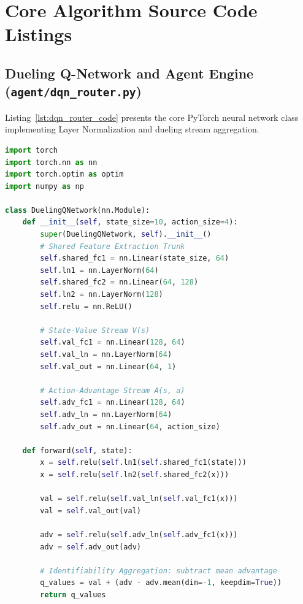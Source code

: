 \chapter{Core Algorithm Source Code Listings}
\label{app:listings}

\section{Dueling Q-Network and Agent Engine (\texttt{agent/dqn\_router.py})}
Listing~\ref{lst:dqn_router_code} presents the core PyTorch neural network class implementing Layer Normalization and dueling stream aggregation.

\begin{lstlisting}[language=Python, caption={PyTorch Dueling Q-Network Architecture with Layer Normalization}, label={lst:dqn_router_code}]
import torch
import torch.nn as nn
import torch.optim as optim
import numpy as np

class DuelingQNetwork(nn.Module):
    def __init__(self, state_size=10, action_size=4):
        super(DuelingQNetwork, self).__init__()
        # Shared Feature Extraction Trunk
        self.shared_fc1 = nn.Linear(state_size, 64)
        self.ln1 = nn.LayerNorm(64)
        self.shared_fc2 = nn.Linear(64, 128)
        self.ln2 = nn.LayerNorm(128)
        self.relu = nn.ReLU()

        # State-Value Stream V(s)
        self.val_fc1 = nn.Linear(128, 64)
        self.val_ln = nn.LayerNorm(64)
        self.val_out = nn.Linear(64, 1)

        # Action-Advantage Stream A(s, a)
        self.adv_fc1 = nn.Linear(128, 64)
        self.adv_ln = nn.LayerNorm(64)
        self.adv_out = nn.Linear(64, action_size)

    def forward(self, state):
        x = self.relu(self.ln1(self.shared_fc1(state)))
        x = self.relu(self.ln2(self.shared_fc2(x)))

        val = self.relu(self.val_ln(self.val_fc1(x)))
        val = self.val_out(val)

        adv = self.relu(self.adv_ln(self.adv_fc1(x)))
        adv = self.adv_out(adv)

        # Identifiability Aggregation: subtract mean advantage
        q_values = val + (adv - adv.mean(dim=-1, keepdim=True))
        return q_values
\end{lstlisting}

